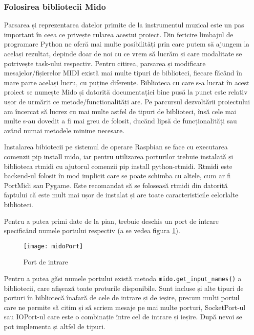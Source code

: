 \documentclass[../IoMusT.tex]{subfiles}
\begin{document}
\subsubsection{Folosirea bibliotecii Mido}
Parsarea și reprezentarea datelor primite de la instrumentul muzical este un pas important în ceea ce privește rularea acestui proiect. Din fericire limbajul de programare Python ne oferă mai multe posibilități prin care putem să ajungem la același rezultat, depinde doar de noi cu ce vrem să lucrăm și care modalitate se potrivește task-ului respectiv. Pentru citirea, parsarea și modificare mesajelor/fișierelor MIDI există mai multe tipuri de biblioteci, fiecare făcând în mare parte același lucru, cu puține diferențe. Biblioteca cu care s-a lucrat în acest proiect se numește Mido și datorită documentației bine pusă la punct este relativ ușor de urmărit ce metode/funcționalități are. Pe parcursul dezvoltării proiectului am încercat să lucrez cu mai multe astfel de tipuri de biblioteci, însă cele mai multe s-au dovedit a fi mai greu de folosit, ducănd lipsă de funcționalități sau având numai metodele minime necesare.
\\
\par Instalarea bibiotecii pe sistemul de operare Raspbian se face cu executarea comenzii pip install mido, iar pentru utilizarea porturilor trebuie instalată și biblioteca rtmidi cu ajutorul comenzii pip install python-rtmidi. Rtmidi este backend-ul folosit în mod implicit care se poate schimba cu altele, cum ar fi PortMidi sau Pygame. Este recomandat să se foloseasă rtmidi din datorită faptului că este mult mai ușor de instalat și are toate caracteristicile celorlalte biblioteci. 
\\
\par Pentru a putea primi date de la pian, trebuie deschis un port de intrare specificând numele portului respectiv (a se vedea figura \ref{fig:port}).
\begin{figure}[h]
\centering
\texttt{[image: midoPort]}
\caption{Port de intrare}
\label{fig:port}
\end{figure}
 Pentru a putea găsi numele portului există metoda \verb|mido.get_input_names()| a bibliotecii, care afișează toate proturile disponibile. Sunt incluse și alte tipuri de porturi în bibliotecă înafară de cele de intrare și de ieșire, precum multi portul care ne permite să citim și să scriem mesaje pe mai multe porturi, SocketPort-ul sau IOPort-ul care este o combinație între cel de intrare și ieșire. După nevoi se pot implementa și altfel de tipuri.
\\
\end{document}
